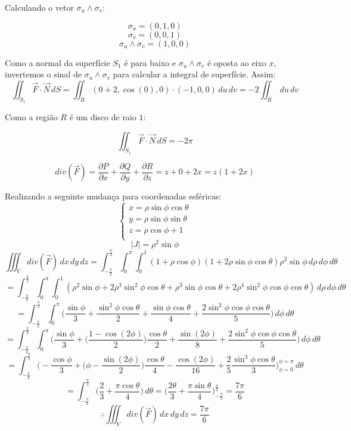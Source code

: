 \documentclass[12pt,a4paper]{article}
\begin{document}
Calculando o vetor $\sigma_u \wedge \sigma_v$:

\[ \sigma_u = (0,1, 0 ) \]
\[ \sigma_v = (0,0, 1 ) \]
\[  \sigma_u \wedge \sigma_v = ( 1, 0, 0 ) \] 

Como a normal da superfície $S_1$ é para baixo e $\sigma_u \wedge \sigma_v$ é oposta ao eixo $x$, invertemos o sinal de $\sigma_u \wedge \sigma_v$ para calcular a integral de superfície. Assim:
$$ \iint_{S_1} \vec{F}  \cdot \vec{N} \,dS = \iint_{R} (0 + 2 , \cos(0), 0 ) \cdot (-1, 0, 0) \,du \,dv = -2 \iint_{R}   \,du \,dv  $$

Como a região $R$ é um disco de raio $1$:


\begin{equation}
\iint_{S_1} \vec{F}  \cdot \vec{N} \,dS = -2\pi
\label{eq:2}
\end{equation}

$$ div(\vec{F}) =  \frac{\partial P}{\partial x} + \frac{\partial Q}{\partial y} + \frac{\partial R}{\partial z}  = z + 0 + 2x =  z(1+2x) $$

Realizando a seguinte mudança para coordenadas esféricas:
\begin{equation}
\begin{cases}
x = \rho\sin\phi\cos\theta\\
y = \rho\sin\phi\sin\theta\\ 
z = \rho\cos\phi + 1\\
\end{cases}
\label{eq:mudanca}
\end{equation}
$$ |J| = \rho^2 \sin\phi $$
$$ \iiint_{V} div(\vec{F}) \,dx \,dy \,dz = \int_{-\frac{\pi}{2}}^{\frac{\pi}{2}} \int_{0}^{\pi} \int_{0}^{1} (1 + \rho\cos\phi)(1 + 2\rho\sin\phi\cos\theta)\rho^2 \sin\phi \,d\rho \,d\phi \,d\theta $$
$$ =  \int_{-\frac{\pi}{2}}^{\frac{\pi}{2}} \int_{0}^{\pi} \int_{0}^{1} ( \rho^2 \sin\phi + 2 \rho^3\sin^2\phi\cos\theta + \rho^3\sin\phi\cos\theta + 2\rho^4\sin^2\phi\cos\phi\cos\theta )  \,d\rho \,d\phi \,d\theta  $$
$$ =  \int_{-\frac{\pi}{2}}^{\frac{\pi}{2}} \int_{0}^{\pi} \Big(  \frac{\sin\phi}{3} +  \frac{\sin^2\phi\cos\theta}{2} + \frac{\sin\phi\cos\theta}{4} + \frac{2\sin^2\phi\cos\phi\cos\theta}{5} \Big) \,d\phi \,d\theta  $$
$$ =  \int_{-\frac{\pi}{2}}^{\frac{\pi}{2}} \int_{0}^{\pi} \Big(  \frac{\sin\phi}{3} +  \Big( \frac{1 - \cos(2\phi)}{2} \Big) \frac{\cos\theta}{2} + \frac{\sin(2\phi)}{8} + \frac{2\sin^2\phi\cos\phi\cos\theta}{5} \Big) \,d\phi \,d\theta  $$
$$ =  \int_{-\frac{\pi}{2}}^{\frac{\pi}{2}} \Big( - \frac{\cos\phi}{3} +  \Big( \phi - \frac{ \sin(2\phi)}{2} \Big) \frac{\cos\theta}{4} - \frac{\cos(2\phi)}{16} + \frac{2}{5} \frac{\sin^3\phi\cos\theta}{3} \Big)_{\phi=0}^{\phi=\pi}  \,d\theta $$
$$ =  \int_{-\frac{\pi}{2}}^{\frac{\pi}{2}} \Big(  \frac{2}{3} +  \frac{\pi\cos\theta}{4}  \Big) \,d\theta =  \Big(  \frac{2\theta}{3} +  \frac{\pi\sin\theta}{4}  \Big)_{-\frac{\pi}{2}}^{\frac{\pi}{2}} = \frac{7\pi}{6} $$
\begin{equation}
\therefore \iiint_{V} div(\vec{F}) \,dx \,dy \,dz = \frac{7\pi}{6}
\label{eq:3}
\end{equation} \\
\end{document}
